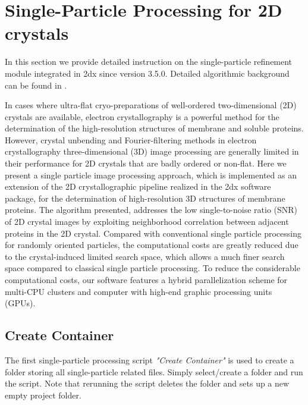 \section{Single-Particle Processing for 2D crystals}

In this section we provide detailed instruction on the single-particle refinement module integrated in 2dx since version 3.5.0. Detailed algorithmic background can be found in \cite{scherer2013single}.

In cases where ultra-flat cryo-preparations of well-ordered two-dimensional (2D) crystals are available, electron crystallography is a powerful method for the determination of the high-resolution structures of membrane and soluble proteins. However, crystal unbending and Fourier-filtering methods in electron crystallography three-dimensional (3D) image processing are generally limited in their performance for 2D crystals that are badly ordered or non-flat. Here we present a single particle image processing approach, which is implemented as an extension of the 2D crystallographic pipeline realized in the 2dx software package, for the determination of high-resolution 3D structures of membrane proteins. The algorithm presented, addresses the low single-to-noise ratio (SNR) of 2D crystal images by exploiting neighborhood correlation between adjacent proteins in the 2D crystal. Compared with conventional single particle processing for randomly oriented particles, the computational costs are greatly reduced due to the crystal-induced limited search space, which allows a much finer search space compared to classical single particle processing. To reduce the considerable computational costs, our software features a hybrid parallelization scheme for multi-CPU clusters and computer with high-end graphic processing units (GPUs).

\subsection{Create Container}
The first single-particle processing script \textit{"Create Container"} is used to create a folder storing all single-particle related files. Simply select/create a folder and run the script. Note that rerunning the script deletes the folder and sets up a new empty project folder.
